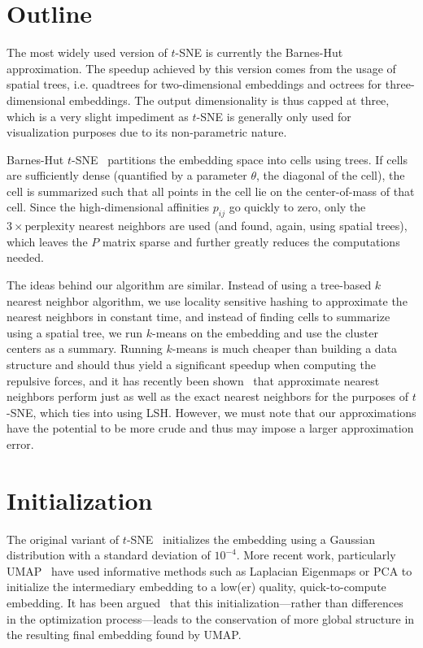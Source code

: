 \section{Outline}

The most widely used version of $t$-SNE is currently the Barnes-Hut
approximation.  The speedup achieved by this version comes from the usage of
spatial trees, i.e.  quadtrees for two-dimensional embeddings and octrees for
three-dimensional embeddings.  The output dimensionality is thus capped at
three, which is a very slight impediment as $t$-SNE is generally only used for
visualization purposes due to its non-parametric nature.

Barnes-Hut $t$-SNE~\cite{bhtsne} partitions the embedding space into cells using trees. If
cells are sufficiently dense (quantified by a parameter $\theta$, the diagonal
of the cell), the cell is summarized such that all points in the
cell lie on the center-of-mass of that cell. Since the high-dimensional
affinities $p_{ij}$ go quickly to zero, only the $3 \times \text{perplexity}$ nearest
neighbors are used (and found, again, using spatial trees), which leaves the
$P$ matrix sparse and further greatly reduces the computations needed.

The ideas behind our algorithm are similar. Instead of using a tree-based $k$
nearest neighbor algorithm, we use locality sensitive hashing to approximate
the nearest neighbors in constant time, and instead of finding cells to
summarize using a spatial tree, we run $k$-means on the embedding and use the
cluster centers as a summary. Running $k$-means is much cheaper than building a
data structure and should thus yield a significant speedup when computing the
repulsive forces, and it has recently been shown~\cite{fitsne} that approximate
nearest neighbors perform just as well as the exact nearest neighbors for the
purposes of $t$-SNE, which ties into using LSH. However, we must note that our
approximations have the potential to be more crude and thus may impose a larger
approximation error.


\section{Initialization}

The original variant of $t$-SNE~\cite{tsne} initializes the embedding using a
Gaussian distribution with a standard deviation of $10^{-4}$. More recent work,
particularly UMAP~\cite{umap} have used informative methods such as Laplacian
Eigenmaps or PCA to initialize the intermediary embedding to a low(er) quality,
quick-to-compute embedding. It has been argued~\cite{umap_rebuttal} that this
initialization---rather than differences in the optimization process---leads to
the conservation of more global structure in the resulting final embedding
found by UMAP.

